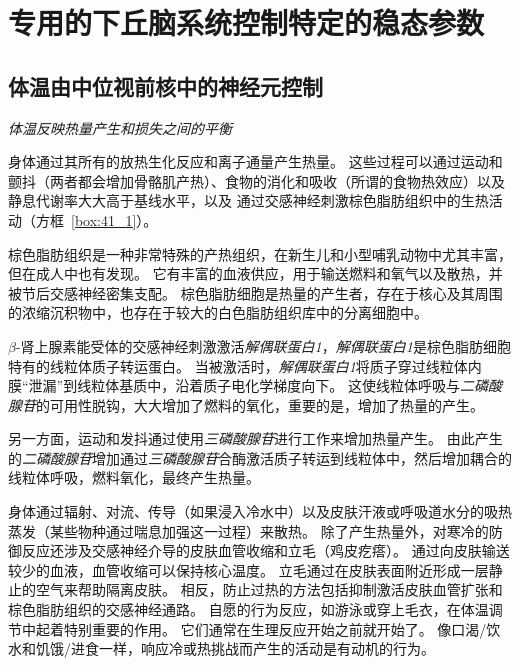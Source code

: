 \section{专用的下丘脑系统控制特定的稳态参数}

\subsection{体温由中位视前核中的神经元控制}

\textit{体温反映热量产生和损失之间的平衡}

身体通过其所有的放热生化反应和离子通量产生热量。
这些过程可以通过运动和颤抖（两者都会增加骨骼肌产热）、食物的消化和吸收（所谓的食物热效应）以及静息代谢率大大高于基线水平，以及 通过交感神经刺激棕色脂肪组织中的生热活动（方框~\ref{box:41_1}）。


\begin{proposition} \label{box:41_1}
	
	\quad \quad 棕色脂肪组织是一种非常特殊的产热组织，在新生儿和小型哺乳动物中尤其丰富，但在成人中也有发现。
	它有丰富的血液供应，用于输送燃料和氧气以及散热，并被节后交感神经密集支配。
	棕色脂肪细胞是热量的产生者，存在于核心及其周围的浓缩沉积物中，也存在于较大的白色脂肪组织库中的分离细胞中。
	
	\quad \quad $\beta$-肾上腺素能受体的交感神经刺激激活\textit{解偶联蛋白1}，\textit{解偶联蛋白1}是棕色脂肪细胞特有的线粒体质子转运蛋白。
	当被激活时，\textit{解偶联蛋白1}将质子穿过线粒体内膜“泄漏”到线粒体基质中，沿着质子电化学梯度向下。
	这使线粒体呼吸与\textit{二磷酸腺苷}的可用性脱钩，大大增加了燃料的氧化，重要的是，增加了热量的产生。
	
	\quad \quad 另一方面，运动和发抖通过使用\textit{三磷酸腺苷}进行工作来增加热量产生。
	由此产生的\textit{二磷酸腺苷}增加通过\textit{三磷酸腺苷}合酶激活质子转运到线粒体中，然后增加耦合的线粒体呼吸，燃料氧化，最终产生热量。
	
\end{proposition}


身体通过辐射、对流、传导（如果浸入冷水中）以及皮肤汗液或呼吸道水分的吸热蒸发（某些物种通过喘息加强这一过程）来散热。
除了产生热量外，对寒冷的防御反应还涉及交感神经介导的皮肤血管收缩和立毛（鸡皮疙瘩）。
通过向皮肤输送较少的血液，血管收缩可以保持核心温度。
立毛通过在皮肤表面附近形成一层静止的空气来帮助隔离皮肤。
相反，防止过热的方法包括抑制激活皮肤血管扩张和棕色脂肪组织的交感神经通路。
自愿的行为反应，如游泳或穿上毛衣，在体温调节中起着特别重要的作用。
它们通常在生理反应开始之前就开始了。
像口渴/饮水和饥饿/进食一样，响应冷或热挑战而产生的活动是有动机的行为。


